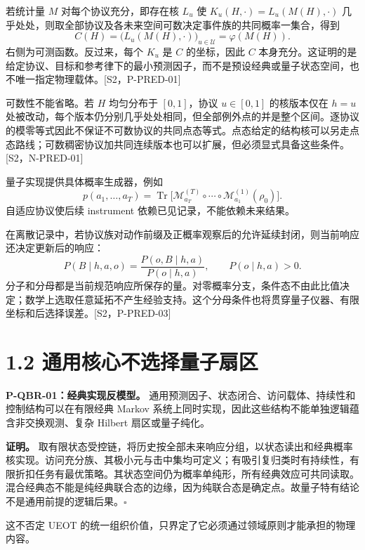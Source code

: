 \documentclass[
  11pt,
  oneside]{book}
\begin{document}
若统计量 \(M\) 对每个协议充分，即存在核 \(L_u\) 使
\(K_u(H,\cdot)=L_u(M(H),\cdot)\)
几乎处处，则取全部协议及各未来空间可数决定事件族的共同概率一集合，得到
\[
C(H)=\bigl(L_u(M(H),\cdot)\bigr)_{u\in\mathcal U}=\varphi(M(H)).
\] 右侧为可测函数。反过来，每个 \(K_u\) 是 \(C\) 的坐标，因此 \(C\)
本身充分。这证明的是给定协议、目标和参考律下的最小预测因子，而不是预设经典或量子状态空间，也不唯一指定物理载体。{[}S2，P-PRED-01{]}

可数性不能省略。若 \(H\) 均匀分布于 \([0,1]\)，协议 \(u\in[0,1]\)
的核版本仅在 \(h=u\)
处被改动，每个版本仍分别几乎处处相同，但全部例外点的并是整个区间。逐协议的模零等式因此不保证不可数协议的共同点态等式。点态给定的结构核可以另走点态路线；可数稠密协议加共同连续版本也可以扩展，但必须显式具备这些条件。{[}S2，N-PRED-01{]}

量子实现提供具体概率生成器，例如 \[
p(a_1,\ldots,a_T)=
\operatorname{Tr}\bigl[
\mathcal M_{a_T}^{(T)}\circ\cdots\circ
\mathcal M_{a_1}^{(1)}(\rho_0)\bigr].
\] 自适应协议使后续 instrument 依赖已见记录，不能依赖未来结果。

在离散记录中，若协议族对动作前缀及正概率观察后的允许延续封闭，则当前响应还决定更新后的响应：
\[
P(B\mid h,a,o)=\frac{P(o,B\mid h,a)}{P(o\mid h,a)},\qquad P(o\mid h,a)>0.
\]
分子和分母都是当前规范响应所保存的量。对零概率分支，条件态不由此比值决定；数学上选取任意延拓不产生经验支持。这个分母条件也将贯穿量子仪器、有限坐标和后选择误差。{[}S2，P-PRED-03{]}

\hypertarget{ux901aux7528ux6838ux5fc3ux4e0dux9009ux62e9ux91cfux5b50ux6247ux533a}{%
\section{1.2
通用核心不选择量子扇区}\label{ux901aux7528ux6838ux5fc3ux4e0dux9009ux62e9ux91cfux5b50ux6247ux533a}}

\protect\hypertarget{p-qbr-01}{}{}

\textbf{P-QBR-01：经典实现反模型。}
通用预测因子、状态闭合、访问载体、持续性和控制结构可以在有限经典 Markov
系统上同时实现，因此这些结构不能单独逻辑蕴含非交换观测、复杂 Hilbert
扇区或量子纯化。

\textbf{证明。}
取有限状态受控链，将历史按全部未来响应分组，以状态读出和经典概率核实现。访问充分族、其极小元与击中集均可定义；有吸引复归类时有持续性，有限折扣任务有最优策略。其状态空间仍为概率单纯形，所有经典效应可共同读取。混合经典态不能是纯经典联合态的边缘，因为纯联合态是确定点。故量子特有结论不是通用前提的逻辑后果。\(\square\)

这不否定 UEOT
的统一组织价值，只界定了它必须通过领域原则才能承担的物理内容。
\end{document}
